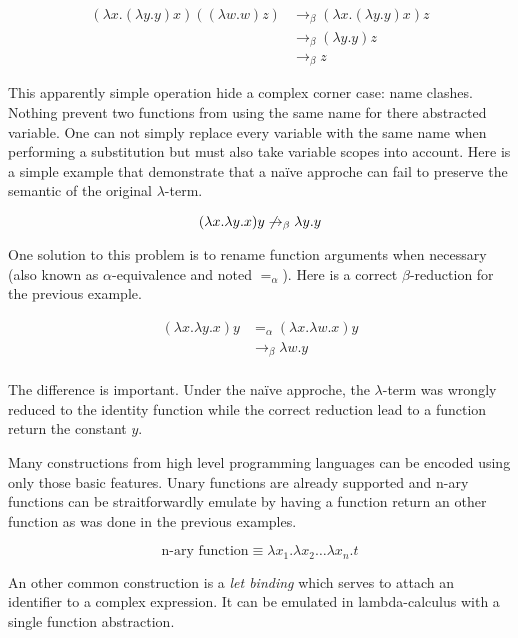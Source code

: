 \begin{align*}
  (\lambda x. (\lambda y. y) x) ((\lambda w. w) z)
    & \to_\beta (\lambda x. (\lambda y. y) x) z \\
    & \to_\beta (\lambda y. y) z \\
    & \to_\beta z
\end{align*}

This apparently simple operation hide a complex corner case: name clashes. Nothing prevent two
functions from using the same name for there abstracted variable. One can not simply replace every
variable with the same name when performing a substitution but must also take variable scopes into
account. Here is a simple example that demonstrate that a naïve approche can fail to preserve the
semantic of the original $\lambda$-term.

\begin{displaymath}
  (\lambda x. \lambda y. x) y \not\to_\beta \lambda y. y \\
\end{displaymath}

One solution to this problem is to rename function arguments when necessary (also known as
$\alpha$-equivalence and noted $=_\alpha$). Here is a correct $\beta$-reduction for the previous
example.

\begin{align*}
  (\lambda x. \lambda y. x) y
    & =_\alpha (\lambda x. \lambda w. x) y \\
    & \to_\beta \lambda w. y \\
\end{align*}

The difference is important. Under the naïve approche, the $\lambda$-term was wrongly reduced to the
identity function while the correct reduction lead to a function return the constant $y$.

Many constructions from high level programming languages can be encoded using only those basic
features.  Unary functions are already supported and n-ary functions can be straitforwardly emulate
by having a function return an other function as was done in the previous examples.

\begin{displaymath}
  \text{n-ary function} \equiv \lambda x_1. \lambda x_2 \dots \lambda x_n. t
\end{displaymath}

An other common construction is a \emph{let binding} which serves to attach an identifier to a
complex expression. It can be emulated in lambda-calculus with a single function abstraction.

